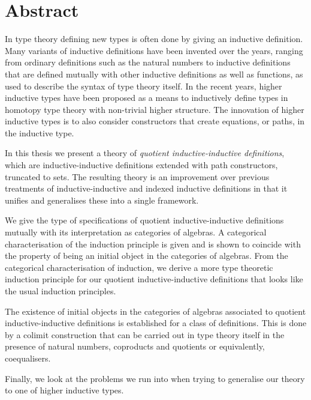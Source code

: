 \chapter*{Abstract}

In type theory defining new types is often done by giving an inductive
definition. Many variants of inductive definitions have been invented
over the years, ranging from ordinary definitions such as the natural
numbers to inductive definitions that are defined mutually with other
inductive definitions as well as functions, as used to describe the
syntax of type theory itself. In the recent years, higher inductive
types have been proposed as a means to inductively define types in
homotopy type theory with non-trivial higher structure. The innovation
of higher inductive types is to also consider constructors that create
equations, or paths, in the inductive type.

In this thesis we present a theory of \emph{quotient
  inductive-inductive definitions}, which are inductive-inductive
definitions extended with path constructors, truncated to sets. The
resulting theory is an improvement over previous treatments of
inductive-inductive and indexed inductive definitions in that it
unifies and generalises these into a single framework.

We give the type of specifications of quotient inductive-inductive
definitions mutually with its interpretation as categories of
algebras. A categorical characterisation of the induction principle is
given and is shown to coincide with the property of being an initial
object in the categories of algebras. From the categorical
characterisation of induction, we derive a more type theoretic
induction principle for our quotient inductive-inductive definitions
that looks like the usual induction principles.

The existence of initial objects in the categories of algebras
associated to quotient inductive-inductive definitions is established
for a class of definitions. This is done by a colimit construction
that can be carried out in type theory itself in the presence of
natural numbers, coproducts and quotients or equivalently,
coequalisers.

Finally, we look at the problems we run into when trying to generalise
our theory to one of higher inductive types.



